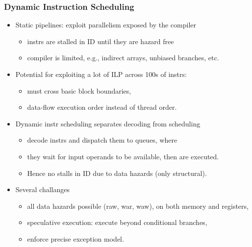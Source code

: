 \documentclass{beamer}
\begin{document}
\begin{frame}[fragile,t]
\frametitle{Dynamic Instruction Scheduling}

\begin{itemize}
    \item Static pipelines: exploit parallelism exposed by the compiler\pause
            \begin{itemize}
                \item instrs are stalled in ID until they are hazard free
                \item compiler is limited, e.g., 
                        indirect arrays, unbiased branches, etc.
            \end  {itemize}\medskip
 
    \item Potential for exploiting a lot of ILP across 100s of instrs:\pause
            \begin{itemize}
                \item must cross basic block boundaries,
                \item data-flow execution order instead of thread order.
            \end  {itemize}\medskip

    \item Dynamic instr scheduling separates decoding from scheduling\pause
            \begin{itemize}
                \item decode instrs and dispatch them to queues, where
                \item they wait for input operands to be available,
                        then are executed.
                \item Hence no stalls in ID due to data hazards (only structural).
            \end  {itemize}\medskip

    \item Several challanges\pause
            \begin{itemize}
                \item all data hazards possible ({\sc raw}, {\sc war}, {\sc waw}),
                        on both memory and registers,
                \item speculative execution: execute beyond conditional branches,
                \item enforce precise exception model.
            \end  {itemize}\medskip
\end  {itemize}

\end{frame}
\end{document}
